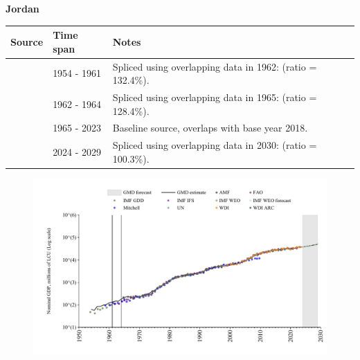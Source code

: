 \documentclass[12pt,a4paper,landscape]{article}
\begin{document}
\begin{adjustbox}{max totalsize={\paperwidth}{\paperheight},center}
\begin{minipage}[t][\textheight][t]{\textwidth}
\vspace*{0.5cm}
{}
\begin{center}
{\Large\bfseries Jordan}
\end{center}
\vspace{0.5cm}
\begin{table}[H]
\centering
\small
\begin{tabular}{|l|l|l|}
\hline
\textbf{Source} & \textbf{Time span} & \textbf{Notes} \\
\hline
\rowcolor{white}\cite{IMF_GDD}& 1954 - 1961 &Spliced using overlapping data in 1962: (ratio = 132.4\%).\\
\rowcolor{lightgray}\cite{IMF_IFS}& 1962 - 1964 &Spliced using overlapping data in 1965: (ratio = 128.4\%).\\
\rowcolor{white}\cite{WDI}& 1965 - 2023 &Baseline source, overlaps with base year 2018.\\
\rowcolor{lightgray}\cite{IMF_WEO_forecast}& 2024 - 2029 &Spliced using overlapping data in 2030: (ratio = 100.3\%).\\
\hline
\end{tabular}
\end{table}
\begin{figure}[H]
\centering
\includegraphics[width=\textwidth,height=0.6\textheight,keepaspectratio]{graphs/JOR_nGDP.pdf}
\end{figure}
\end{minipage}
\end{adjustbox}
\end{document}
